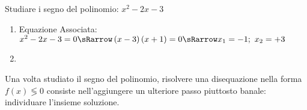 \begin{esempio}{}{}
Studiare i segno del polinomio: \(x^2-2x-3\)

\begin{enumerate}
\item
Equazione Associata:~~
\(x^2-2x-3=0 \sRarrow 
  \left(x-3 \right)\left(x+1\right)=0 \sRarrow 
  x_1=-1;~x_2=+3\)
\item 
{}
                  {}
\end{enumerate}

\end{esempio}

Una volta studiato il segno del polinomio, risolvere una disequazione nella 
forma \(f(x) \lessgtr 0\) consiste nell'aggiungere un ulteriore passo 
piuttosto banale: individuare l'insieme soluzione.


